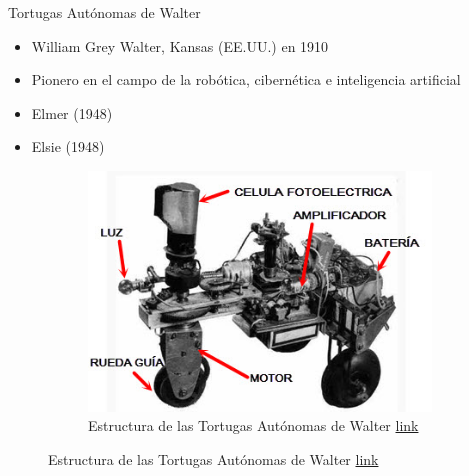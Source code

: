 \begin{frame}[fragile]{Tortugas Autónomas de Walter}
	\vspace{10px}
	\pause
	\begin{block}{}
		\begin{itemize}
			\item William Grey Walter, Kansas (EE.UU.) en 1910
			\pause
			\item Pionero en el campo de la robótica, cibernética e inteligencia artificial
			\pause
			\item Elmer (1948)
			\pause
			\item Elsie (1948)
		\end{itemize}
	\end{block}
	\begin{figure}
		\centering
		\pause
		\begin{subfigure}{0.48\textwidth}
			\centering
			\includegraphics[scale=0.5]{./EtapaPrimeriza/imagenes/t1.jpg}
			\caption{Estructura de las Tortugas Autónomas de Walter \href{https://vonneumannmachine.files.wordpress.com/2011/05/elsie.jpg}{link}}
		\end{subfigure}
	\end{figure}
\end{frame}



